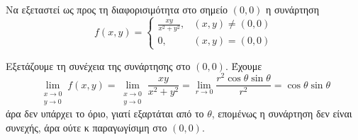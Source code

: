 \begin{example}
  Να εξεταστεί ως προς τη διαφορισιμότητα στο σημείο $(0,0)$ 
  η συνάρτηση 
  \[ 
    f(x,y) = 
    \begin{cases} 
      \frac{xy}{x^{2}+y^{2}}, &(x,y) \neq (0,0) \\ 0, & (x,y) = (0,0) 
    \end{cases} 
  \]
\end{example}
\begin{solution}
\item {}
  Εξετάζουμε τη συνέχεια της συνάρτησης στο $ (0,0) $. Έχουμε
  \[ \lim\limits_{\substack{x\to 0 \\y \to 0}} f(x,y) =
    \lim\limits_{\substack{x\to 0 \\y \to 0}} \frac{xy}{x^{2}+y^{2}} =
    \lim_{r \to 0} \frac{r^{2} \cos{\theta} \sin{\theta}}{r^{2}} =
  \cos{\theta} \sin{\theta} \] άρα δεν υπάρχει το όριο, γιατί εξαρτάται από το 
  $\theta$, επομένως η συνάρτηση δεν είναι συνεχής, άρα ούτε κ παραγωγίσιμη στο 
  $ (0,0) $.
\end{solution}

